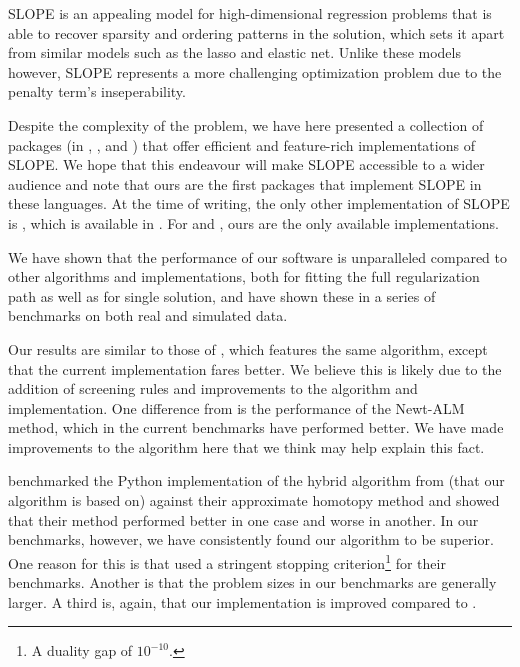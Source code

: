 \documentclass[article]{jss}
\begin{document}
SLOPE is an appealing model for high-dimensional regression problems that is
able to recover sparsity and ordering patterns in the solution, which sets it
apart from similar models such as the lasso and elastic net. Unlike these models
however, SLOPE represents a more challenging optimization problem due to the
penalty term's inseperability.

Despite the complexity of the problem, we have here presented a collection of
packages (in , , and ) that offer
efficient and feature-rich implementations of SLOPE. We hope that this
endeavour will make SLOPE accessible to a wider audience and note that ours are
the first packages that implement SLOPE in these languages. At the time of
writing, the only other implementation of SLOPE is , which is
available in . For  and , ours are
the only available implementations.

We have shown that the performance of our software is unparalleled
compared to other algorithms and implementations, both for fitting
the full regularization path as well as for single solution, and
have shown these in a series of benchmarks on both real and simulated
data.

Our results are similar to those of \citet{larsson2023}, which features the
same algorithm, except that the current implementation fares better. We
believe this is likely due to the addition of screening rules and improvements
to the algorithm and implementation. One difference from \citet{larsson2023} is
the performance of the Newt-ALM method, which in the current benchmarks have
performed better. We have made improvements to the algorithm here that we think may
help explain this fact.

\citet{dupuis2024} benchmarked the Python implementation of the hybrid
algorithm from \citet{larsson2023} (that our algorithm is based on) against
their approximate homotopy method and showed that their method performed better
in one case and worse in another. In our benchmarks, however, we have
consistently found our algorithm to be superior. One reason for this is that
\citet{dupuis2024} used a stringent stopping criterion\footnote{A duality
  gap of \(10^{-10}\).} for their benchmarks. Another is that the problem sizes in
our benchmarks are generally larger. A third is, again, that our implementation
is improved compared to \citet{larsson2023}.
\end{document}
